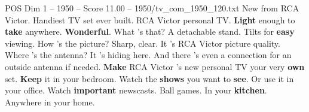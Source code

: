 \begin{textsample}{POS Dim 1 – 1950 – Score 11.00 – 1950/tv\_com\_1950\_120.txt}  \label{ex:f1_pos_001}
New from RCA Victor.
Handiest TV set ever built.
RCA Victor personal TV. \textbf{Light} enough to \textbf{take} anywhere. \textbf{Wonderful}.
What 's that?
A detachable stand.
Tilts for \textbf{easy} viewing.
How 's the picture?
Sharp, clear.
It 's RCA Victor picture quality.
Where 's the antenna?
It 's hiding here.
And there 's even a connection for an outside antenna if needed. \textbf{Make} RCA Victor 's new personal TV your very \textbf{own} set. \textbf{Keep} it in your bedroom.
Watch the \textbf{shows} you want to \textbf{see}.
Or use it in your office.
Watch \textbf{important} newscasts.
Ball games.
In your \textbf{kitchen}.
Anywhere in your home.

\end{textsample}
